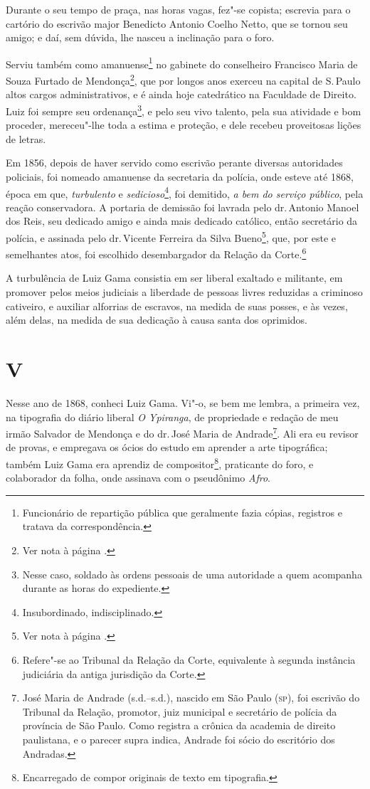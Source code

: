 Durante o seu tempo de praça, nas horas vagas, fez"-se copista; escrevia
para o cartório do escrivão major Benedicto Antonio Coelho Netto, que se
tornou seu amigo; e daí, sem dúvida, lhe nasceu a inclinação para o
foro.

Serviu também como amanuense\footnote{Funcionário de repartição
  pública que geralmente fazia cópias, registros e tratava da
  correspondência.} no gabinete do conselheiro Francisco Maria de Souza
Furtado de Mendonça\footnote{Ver nota à página \pageref{fmfm}.}, que por longos anos exerceu na capital de S.\,Paulo
altos cargos administrativos, e é ainda hoje catedrático na Faculdade de
Direito. Luiz foi sempre seu ordenança\footnote{Nesse caso, soldado às
  ordens pessoais de uma autoridade a quem acompanha durante as horas do
  expediente.}, e pelo seu vivo talento, pela sua atividade e bom
proceder, mereceu"-lhe toda a estima e proteção, e dele recebeu
proveitosas lições de letras.

Em 1856, depois de haver servido como escrivão perante diversas
autoridades policiais, foi nomeado amanuense da secretaria da polícia,
onde esteve até 1868, época em que, \emph{turbulento} e
\emph{sedicioso}\footnote{Insubordinado, indisciplinado.}, foi
demitido, \emph{a bem do serviço público}, pela reação conservadora. A
portaria de demissão foi lavrada pelo dr.\,Antonio Manoel dos Reis, seu
dedicado amigo e ainda mais dedicado católico, então secretário da
polícia, e assinada pelo dr.\,Vicente Ferreira da Silva Bueno\footnote{
  Ver nota à página \pageref{bueno}.}, que, por este e
semelhantes atos, foi escolhido desembargador da Relação da
Corte.\footnote{Refere"-se ao Tribunal da Relação da Corte, equivalente
  à segunda instância judiciária da antiga jurisdição da Corte.}

A turbulência de Luiz Gama consistia em ser liberal exaltado e
militante, em promover pelos meios judiciais a liberdade de pessoas
livres reduzidas a criminoso cativeiro, e auxiliar alforrias de
escravos, na medida de suas posses, e às vezes, além delas, na medida de
sua dedicação à causa santa dos oprimidos.

\section*{V}

Nesse ano de 1868, conheci Luiz Gama. Vi"-o, se bem me lembra, a primeira
vez, na tipografia do diário liberal \emph{O Ypiranga}, de propriedade e
redação de meu irmão Salvador de Mendonça e do dr.\,José Maria de
Andrade\footnote{José Maria de Andrade (s.d.--s.d.), nascido em São \label{maria}
  Paulo (\textsc{sp}), foi escrivão do Tribunal da Relação, promotor, juiz
  municipal e secretário de polícia da província de São Paulo. Como
  registra a crônica da academia de direito paulistana, e o parecer
  supra indica, Andrade foi sócio do escritório dos Andradas.}. Ali era
eu revisor de provas, e empregava os ócios do estudo em aprender a arte
tipográfica; também Luiz Gama era aprendiz de compositor\footnote{
  Encarregado de compor originais de texto em tipografia.}, praticante
do foro, e colaborador da folha, onde assinava com o pseudônimo
\emph{Afro}.

